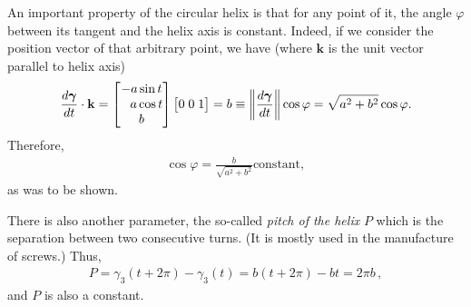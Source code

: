 \documentclass[12pt]{article}
\newcommand{\bg}{\boldsymbol{\gamma}}
\begin{document}
An important property of the circular helix is that for any point of it, the angle $\varphi$ between its tangent and the helix axis is constant. Indeed, if we consider the position vector of that arbitrary point, we have (where $\mathbf{k}$ is the unit vector parallel to helix axis)
\begin{align*}
\frac{d\bg}{dt}\cdot\mathbf{k}=\begin{bmatrix} -a\sin t \\
\hphantom{-}a\cos t \\ b \end{bmatrix}\begin{bmatrix} 0\; 0\; 1\end{bmatrix}=b
\equiv \bigg\lVert\frac{d\bg}{dt}\bigg\rVert\cos\varphi=\sqrt{a^2+b^2}\cos\varphi.
\end{align*} 
Therefore,
\begin{align*}
\cos\varphi=\frac{b}{\sqrt{a^2+b^2}} \text{constant},
\end{align*}
as was to be shown. 

There is also another parameter, the so-called \emph{pitch of the helix} $P$ which is the separation between two consecutive turns. 
(It is mostly used in the manufacture of screws.)
Thus,
\begin{align*}
P=\gamma_3(t+2\pi)-\gamma_3(t)= b(t+2\pi)-bt=2\pi b\,,
\end{align*}
and $P$ is also a constant.


\end{document}

